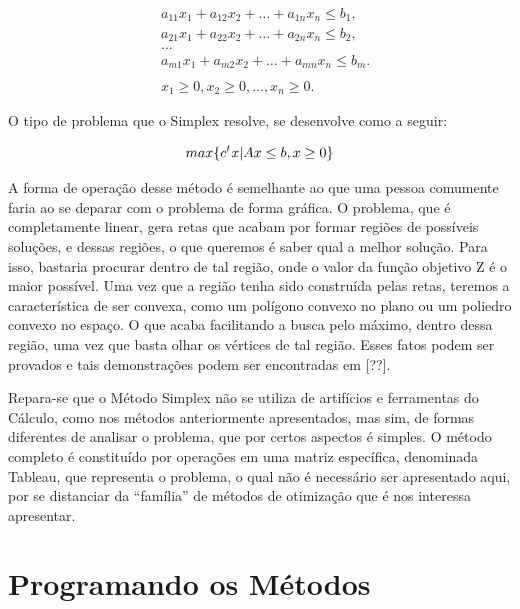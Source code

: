 \begin{equation}
    \begin{array}{ccc}
        &   a_{11}x_1 + a_{12}x_2 + … + a_{1n}x_n \leq b_1,\\
        &   a_{21}x_1 + a_{22}x_2 + … + a_{2n}x_n \leq b_2,\\
        &   ...\\
        &   a_{m1}x_1 + a_{m2}x_2 + … + a_{mn}x_n \leq b_m.\\\\
        &   x_1 \geq 0, x_2 \geq 0, …, x_n \geq 0.
    \end{array}
\end{equation}

O tipo de problema que o Simplex resolve, se desenvolve como a seguir:

\begin{equation}
        max \{c^tx | Ax \leq b, x \geq 0\}\\
\end{equation}


A forma de operação desse método é semelhante ao que uma pessoa comumente
faria ao se deparar com o problema de forma gráfica. O problema, que é
completamente linear, gera retas que acabam por formar regiões de
possíveis soluções, e dessas regiões, o que queremos é saber qual a melhor
solução. Para isso, bastaria procurar dentro de tal região, onde o valor da
função objetivo Z é o maior possível. Uma vez que a região tenha sido
construída pelas retas, teremos a característica de ser convexa, como um
polígono convexo no plano ou um poliedro convexo no espaço. O que acaba
facilitando a busca pelo máximo, dentro dessa região, uma vez que basta olhar
os vértices de tal região. Esses fatos podem ser provados e tais demonstrações
podem ser encontradas em [??].

Repara-se que o Método Simplex não se utiliza de artifícios e ferramentas do
Cálculo, como nos métodos anteriormente apresentados, mas sim, de formas
diferentes de analisar o problema, que por certos aspectos é simples. O método
completo é constituído por operações em uma matriz específica, denominada
Tableau, que representa o problema, o qual não é necessário ser apresentado
aqui, por se distanciar da ``família'' de métodos de otimização que é nos
interessa apresentar.


\section{{Programando os Métodos}}

